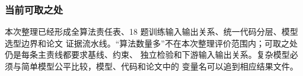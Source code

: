 \subsubsection{当前可取之处}

本次整理已经形成全算法责任表、18 题训练输入输出关系、统一代码分层、模型选型边界和论文
证据流水线。“算法数量多”不在本次整理评价范围内；可取之处仍是每条主责线都要求基线、约束、
独立检验和下游输入输出关系。复杂模型必须与简单模型公平比较，模型、代码和论文中的
变量名可以追到相应结果文件。

